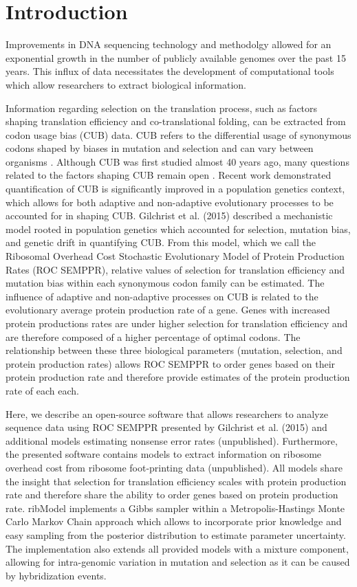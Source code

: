 \documentclass{bioinfo}
\newcommand{\package}{ribModel } %
\begin{document}
\section*{Introduction}
Improvements in DNA sequencing technology and methodolgy allowed for an exponential growth in the number of publicly available genomes over the past 15 years.
This influx of data necessitates the development of computational tools which allow researchers to extract biological information.

Information regarding selection on the translation process, such as factors shaping translation efficiency and co-translational folding, can be extracted from codon usage bias (CUB) data.
CUB refers to the differential usage of synonymous codons shaped by biases in mutation and selection and can vary between organisms \citep{bulmer1991, sharp1993}.
Although CUB was first studied almost 40 years ago, many questions related to the factors shaping CUB remain open \citep{grantham1980_1, grantham1980_2}.
Recent work demonstrated quantification of CUB is significantly improved in a population genetics context, which allows for both adaptive and non-adaptive evolutionary processes to be accounted for in shaping CUB.
Gilchrist et al. (2015) described a mechanistic model rooted in population genetics which accounted for selection, mutation bias, and genetic drift in quantifying CUB. 
From this model, which we call the Ribosomal Overhead Cost Stochastic Evolutionary Model of Protein Production Rates (ROC SEMPPR), relative values of selection for translation efficiency and mutation bias within each synonymous codon family can be estimated. 
The influence of adaptive and non-adaptive processes on CUB is related to the evolutionary average protein production rate of a gene. Genes with increased protein productions rates are under higher selection for translation efficiency and are therefore composed of a higher percentage of optimal codons. The relationship between these three biological parameters (mutation, selection, and protein production rates) allows ROC SEMPPR to order genes based on their protein production rate and therefore provide estimates of the protein production rate of each each. 

Here, we describe an open-source software that allows researchers to analyze sequence data using ROC SEMPPR presented by Gilchrist et al. (2015) and additional models estimating nonsense error rates (unpublished). 
Furthermore, the presented software contains models to extract information on ribosome overhead cost from ribosome foot-printing data (unpublished). 
All models share the insight that selection for translation efficiency scales with protein production rate and therefore share the ability to order genes based on protein production rate. 
\package implements a Gibbs sampler within a Metropolis-Hastings Monte Carlo Markov Chain approach which allows to incorporate prior knowledge and easy sampling from the posterior distribution to estimate parameter uncertainty. 
The implementation also extends all provided models with a mixture component, allowing for intra-genomic variation in mutation and selection as it can be caused by hybridization events.
\end{document}
